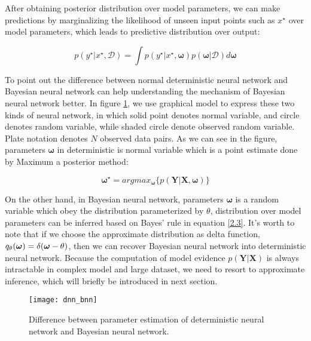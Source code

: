 After obtaining posterior distribution over model parameters, we can make predictions by marginalizing the likelihood of unseen input points such as $x^{\star}$ over model parameters, which leads to predictive distribution over output:

\begin{equation}
p(y^{\star}|x^{\star}, \mathcal D) = \int p(y^{\star}|x^{\star}, \boldsymbol{\omega})p(\boldsymbol{\omega}|\mathcal D)d\boldsymbol{\omega}
\label{2.4}
\end{equation}

To point out the difference between normal deterministic neural network and Bayesian neural network can help understanding the mechanism of Bayesian neural network better. In figure \ref{fig:dnn_bnn}, we use graphical model to express these two kinds of neural network, in which solid point denotes normal variable, and circle denotes random variable, while shaded circle denote observed random variable. Plate notation denotes $N$ observed data pairs. As we can see in the figure, parameters $\boldsymbol{\omega}$ in deterministic is normal variable which is a point estimate done by Maximum a posterior method:

\begin{equation}
\boldsymbol{\omega^{\star}} = argmax_{\boldsymbol{\omega}}\{p(\mathbf{Y}|\mathbf{X}, \boldsymbol{\omega})\}\label{2.5}
\end{equation}

On the other hand, in Bayesian neural network, parameters $\boldsymbol{\omega}$ is a random variable which obey the distribution parameterized by $\theta$, distribution over model parameters can be inferred based on Bayes' rule in equation \ref{2.3}. It's worth to note that if we choose the approximate distribution as delta function, $q_{\theta}(\boldsymbol \omega) = \delta(\boldsymbol \omega - \theta)$, then we can recover Bayesian neural network into deterministic neural network. Because the computation of model evidence $p(\mathbf{Y}|\mathbf{X})$ is always intractable in complex model and large dataset, we need to resort to approximate inference, which will briefly be introduced in next section.


\begin{figure}[h!]
	\begin{center}
		\texttt{[image: dnn\_bnn]}
		\caption{Difference between parameter estimation of deterministic neural network and Bayesian neural network.}		
		\label{fig:dnn_bnn}
	\end{center}
\end{figure}

